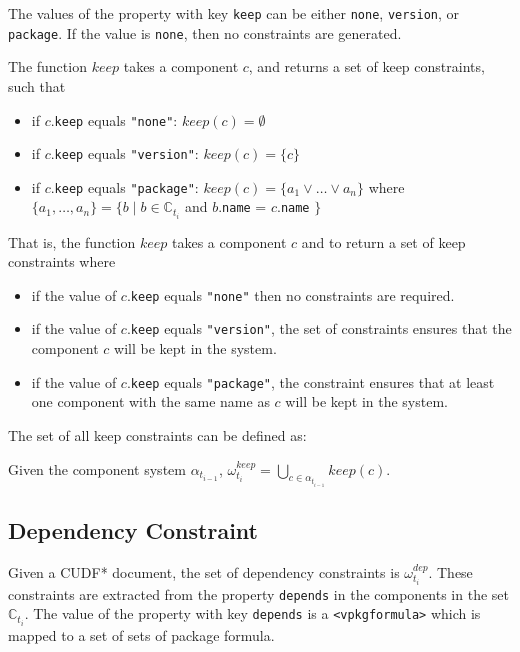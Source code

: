 The values of the property with key \texttt{keep} can be either \texttt{none}, \texttt{version}, or \texttt{package}.
If the value is \texttt{none}, then no constraints are generated.
\begin{defs}
The function $keep$ takes a component $c$, and returns a set of keep constraints, such that
\begin{itemize}
	\item if $c$.\verb+keep+ equals \verb+"none"+: $keep(c) = \emptyset$
	\item if $c$.\verb+keep+ equals \verb+"version"+: $keep(c) = \{c\}$
	\item if $c$.\verb+keep+ equals \verb+"package"+: $keep(c) = \{a_1 \vee \ldots \vee a_n\}$ where $\{a_1,\ldots,a_n\} = \{b \mid b \in \mathbb{C}_{t_i}$ and $b.$\texttt{name} = $c.$\texttt{name} $\}$
\end{itemize}

\end{defs}
That is, the function $keep$ takes a component $c$ and to return a set of keep constraints where
\begin{itemize}
  \item if the value of $c$.\verb+keep+ equals \verb+"none"+ then no constraints are required.
  \item if the value of $c$.\verb+keep+ equals \verb+"version"+, the set of constraints ensures that the component $c$ will be kept in the system.
  \item if the value of $c$.\verb+keep+ equals \verb+"package"+, the constraint ensures that at least one component with the same name as $c$ will be kept in the system.
\end{itemize}

The set of all keep constraints can be defined as:
\begin{defs}
Given the component system $\alpha_{t_{i-1}}$, $\omega_{t_i}^{keep} = \bigcup \limits_{c \in \alpha_{t_{i-1}}} keep(c)$.
\end{defs}

\subsection{Dependency Constraint}
Given a CUDF* document, the set of dependency constraints is $\omega_{t_i}^{dep}$.
These constraints are extracted from the property \texttt{depends} in the components in the set $\mathbb{C}_{t_i}$.
The value of the property with key \texttt{depends} is a \texttt{<vpkgformula>} which is mapped to a set of sets of package formula.

